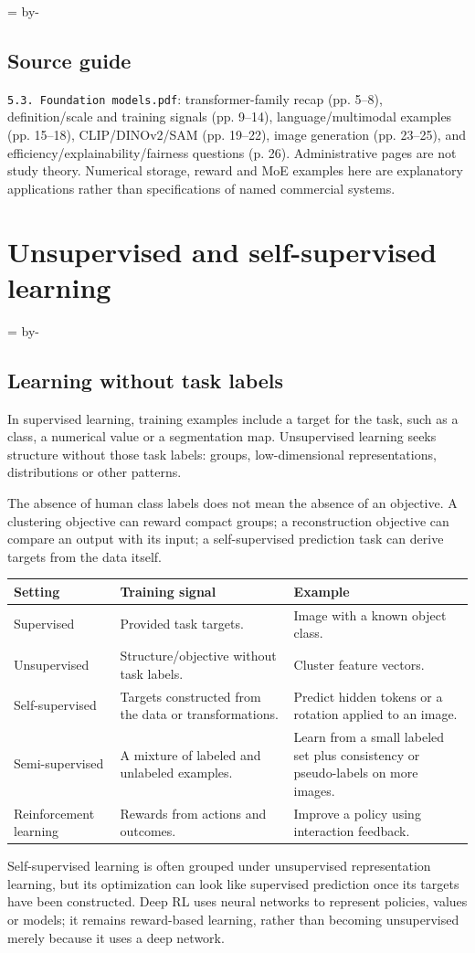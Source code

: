 \documentclass[11pt]{article}
\newcommand{\newsubsection}[1]{\par\begingroup\skip0=\pagegoal\advance\skip0 by-\pagetotal\ifdim\skip0<12\baselineskip\newpage\fi\endgroup\subsection{#1}}
\begin{document}
\newsubsection{Source guide}
\texttt{5.3. Foundation models.pdf}: transformer-family recap (pp. 5--8), definition/scale and training signals (pp. 9--14), language/multimodal examples (pp. 15--18), CLIP/DINOv2/SAM (pp. 19--22), image generation (pp. 23--25), and efficiency/explainability/fairness questions (p. 26). Administrative pages are not study theory. Numerical storage, reward and MoE examples here are explanatory applications rather than specifications of named commercial systems.


\clearpage
\section{Unsupervised and self-supervised learning}

\newsubsection{Learning without task labels}
In supervised learning, training examples include a target for the task, such as a class, a numerical value or a segmentation map. Unsupervised learning seeks structure without those task labels: groups, low-dimensional representations, distributions or other patterns.

The absence of human class labels does not mean the absence of an objective. A clustering objective can reward compact groups; a reconstruction objective can compare an output with its input; a self-supervised prediction task can derive targets from the data itself.

\begin{longtable}{@{}P{.23\textwidth}P{.35\textwidth}P{.32\textwidth}@{}}
\toprule Setting & Training signal & Example\\\midrule\endhead
Supervised & Provided task targets. & Image with a known object class.\\
Unsupervised & Structure/objective without task labels. & Cluster feature vectors.\\
Self-supervised & Targets constructed from the data or transformations. & Predict hidden tokens or a rotation applied to an image.\\
Semi-supervised & A mixture of labeled and unlabeled examples. & Learn from a small labeled set plus consistency or pseudo-labels on more images.\\
Reinforcement learning & Rewards from actions and outcomes. & Improve a policy using interaction feedback.\\\bottomrule
\end{longtable}
Self-supervised learning is often grouped under unsupervised representation learning, but its optimization can look like supervised prediction once its targets have been constructed. Deep RL uses neural networks to represent policies, values or models; it remains reward-based learning, rather than becoming unsupervised merely because it uses a deep network.
\end{document}
